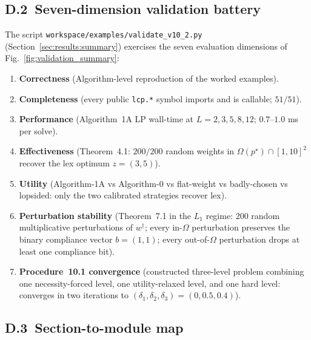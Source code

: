 \subsection*{D.2\ Seven-dimension validation battery}

The script \texttt{workspace/examples/validate\_v10\_2.py} (Section~\ref{sec:results:summary}) exercises the seven evaluation dimensions of Fig.~\ref{fig:validation_summary}:

\begin{enumerate}[leftmargin=*,noitemsep]
\item \textbf{Correctness} (Algorithm-level reproduction of the worked examples).
\item \textbf{Completeness} (every public \texttt{lcp.*} symbol imports and is callable; $51 / 51$).
\item \textbf{Performance} (Algorithm~1A LP wall-time at $L = 2, 3, 5, 8, 12$; $0.7$--$1.0$ ms per solve).
\item \textbf{Effectiveness} (Theorem~4.1: $200/200$ random weights in $\Omega(p^\star) \cap [1,10]^2$ recover the lex optimum $z = (3, 5)$).
\item \textbf{Utility} (Algorithm-1A vs Algorithm-0 vs flat-weight vs badly-chosen vs lopsided: only the two calibrated strategies recover lex).
\item \textbf{Perturbation stability} (Theorem~7.1 in the $L_1$ regime: 200 random multiplicative perturbations of $w^\dagger$; every in-$\Omega$ perturbation preserves the binary compliance vector $b = (1, 1)$; every out-of-$\Omega$ perturbation drops at least one compliance bit).
\item \textbf{Procedure~10.1 convergence} (constructed three-level problem combining one necessity-forced level, one utility-relaxed level, and one hard level: converges in two iterations to $(\delta_1, \delta_2, \delta_3) = (0, 0.5, 0.4)$).
\end{enumerate}

\subsection*{D.3\ Section-to-module map}

